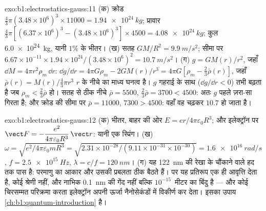 \begin{solution}{exo:b1:electrostatics-gauss:11}
(क) क्रोड $\tfrac43\pi(3.48 \times 10^6)^3 \times 11000 = \qty{1.94e24}{kg}$; प्रावार
$\tfrac43\pi[(6.37 \times 10^6)^3 - (3.48 \times 10^6)^3] \times 4500 = \qty{4.08e24}{kg}$;
कुल \qty{6.0e24}{kg}, यानी $1\%$ के भीतर। (ख) सतह $GM/R^2 = \qty{9.9}{m/s^2}$;
सीमा पर $6.67 \times 10^{-11} \times 1.94 \times 10^{24}/(3.48 \times 10^6)^2 =
\qty{10.7}{m/s^2}$। (ग) $g = GM(r)/r^2$, जहाँ $\dd M = 4\pi r^2\rho_m\,\dd r$:
$\dd g/\dd r = 4\pi G\rho_m - 2GM(r)/r^3 = 4\pi G[\rho_m - \tfrac23\bar\rho(r)]$,
जहाँ $\bar\rho(r) = M(r)/\tfrac43\pi r^3$ $r$ के नीचे का माध्य घनत्व है।
$g$ गहराई के साथ ($\dd g/\dd r < 0$) तभी बढ़ता है जब $\rho_m < \tfrac23\bar\rho$ हो। सतह
से ठीक नीचे $\bar\rho = 5500$, $\tfrac23\bar\rho = 3700 < 4500$: अतः $g$
पहले ज़रा-सा गिरता है; और क्रोड की सीमा पर $\bar\rho = 11000$, $7300 >
4500$: वहाँ वह चढ़कर $10.7$ हो जाता है।
\end{solution}

\begin{solution}{exo:b1:electrostatics-gauss:12}
(क) भीतर, बाहर की ओर $E = er/4\pi\varepsilon_0R^3$; और इलेक्ट्रॉन पर $\vect F =
-\dfrac{e^2}{4\pi\varepsilon_0R^3}\,\vect r$: यानी एक स्प्रिंग। (ख) $\omega = \sqrt{e^2/4\pi\varepsilon_0mR^3}
= \sqrt{2.31 \times 10^{-28}/(9.11 \times 10^{-31} \times 10^{-30})} = \qty{1.6e16}{rad/s}$,
$f = \qty{2.5e15}{Hz}$, $\lambda = c/f = \qty{120}{nm}$। (ग) यह
\qty{122}{nm} की रेखा के चौंकाने वाले हद तक पास है: परमाणु का आकार और उसकी
प्रबलता ठीक बैठते हैं। पर यह प्रतिरूप एक ही आवृत्ति देता है, कोई श्रेणी
नहीं, और नाभिक \qty{0.1}{nm} की गेंद नहीं बल्कि $10^{-15}$~मीटर का बिंदु है
--- और कोई चिरसम्मत परिक्रमा करता इलेक्ट्रॉन अपनी ऊर्जा नैनोसेकंडों में
विकीर्ण कर देता। इसका उपाय \cref{ch:b1:quantum-introduction} है।
\end{solution}

